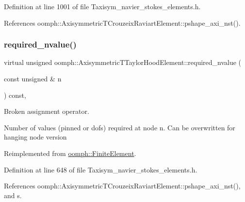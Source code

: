 Definition at line 1001 of file Taxisym\+\_\+navier\+\_\+stokes\+\_\+elements.\+h.



References oomph\+::\+Axisymmetric\+T\+Crouzeix\+Raviart\+Element\+::pshape\+\_\+axi\+\_\+nst().

\mbox{\label{classoomph_1_1AxisymmetricTTaylorHoodElement_a6a5dd6b252f98c37d896a3d6f35d3688}} 
\subsubsection{\texorpdfstring{required\+\_\+nvalue()}{required\_nvalue()}}
{\footnotesize\ttfamily virtual unsigned oomph\+::\+Axisymmetric\+T\+Taylor\+Hood\+Element\+::required\+\_\+nvalue (\begin{DoxyParamCaption}\item[{const unsigned \&}]{n }\end{DoxyParamCaption}) const\hspace{0.3cm}{\ttfamily [inline]}, {\ttfamily [virtual]}}



Broken assignment operator. 

Number of values (pinned or dofs) required at node n. Can be overwritten for hanging node version 

Reimplemented from \hyperlink{classoomph_1_1FiniteElement_a56610c60d5bc2d7c27407a1455471b1a}{oomph\+::\+Finite\+Element}.



Definition at line 648 of file Taxisym\+\_\+navier\+\_\+stokes\+\_\+elements.\+h.



References oomph\+::\+Axisymmetric\+T\+Crouzeix\+Raviart\+Element\+::pshape\+\_\+axi\+\_\+nst(), and s.

\mbox{\label{classoomph_1_1AxisymmetricTTaylorHoodElement_a008b24e28c97a15ccc634ce6fa76a0c2}} 
